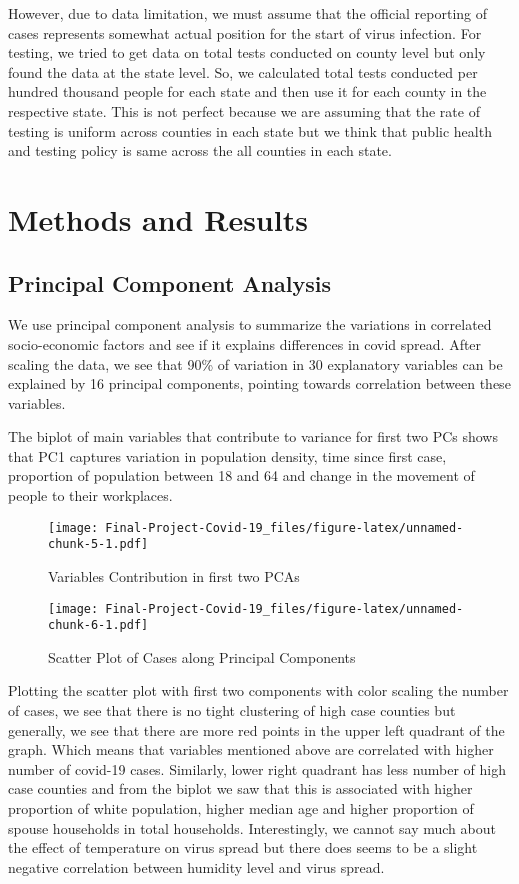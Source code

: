 \documentclass[
]{article}
\begin{document}
However, due to data limitation, we must assume that the official
reporting of cases represents somewhat actual position for the start of
virus infection. For testing, we tried to get data on total tests
conducted on county level but only found the data at the state level.
So, we calculated total tests conducted per hundred thousand people for
each state and then use it for each county in the respective state. This
is not perfect because we are assuming that the rate of testing is
uniform across counties in each state but we think that public health
and testing policy is same across the all counties in each state.

\hypertarget{methods-and-results}{%
\section{Methods and Results}\label{methods-and-results}}

\hypertarget{principal-component-analysis}{%
\subsection{Principal Component
Analysis}\label{principal-component-analysis}}

We use principal component analysis to summarize the variations in
correlated socio-economic factors and see if it explains differences in
covid spread. After scaling the data, we see that 90\% of variation in
30 explanatory variables can be explained by 16 principal components,
pointing towards correlation between these variables.

The biplot of main variables that contribute to variance for first two
PCs shows that PC1 captures variation in population density, time since
first case, proportion of population between 18 and 64 and change in the
movement of people to their workplaces.

\begin{figure}
\centering
\texttt{[image: Final-Project-Covid-19\_files/figure-latex/unnamed-chunk-5-1.pdf]}
\caption{Variables Contribution in first two PCAs}
\end{figure}

\begin{figure}
\centering
\texttt{[image: Final-Project-Covid-19\_files/figure-latex/unnamed-chunk-6-1.pdf]}
\caption{Scatter Plot of Cases along Principal Components}
\end{figure}

Plotting the scatter plot with first two components with color scaling
the number of cases, we see that there is no tight clustering of high
case counties but generally, we see that there are more red points in
the upper left quadrant of the graph. Which means that variables
mentioned above are correlated with higher number of covid-19 cases.
Similarly, lower right quadrant has less number of high case counties
and from the biplot we saw that this is associated with higher
proportion of white population, higher median age and higher proportion
of spouse households in total households. Interestingly, we cannot say
much about the effect of temperature on virus spread but there does
seems to be a slight negative correlation between humidity level and
virus spread.
\end{document}
